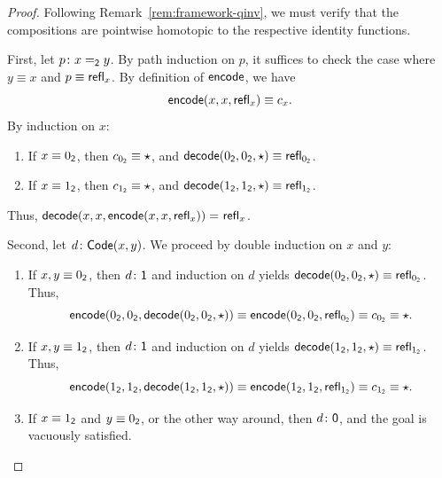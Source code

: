 \begin{proof}
    Following Remark~\ref{rem:framework-qinv}, we must verify that the compositions are pointwise homotopic to the respective identity functions.

    First, let $p\colon x\eq{\fun2}y$. By path induction on $p$, it suffices to check the case where $y\equiv x$ and $p\equiv\mathsf{refl}_x$. By definition of $\mathsf{encode}$, we have
    \[
        \mathsf{encode}(x,x,\mathsf{refl}_x) \equiv c_x.
    \]
    By induction on $x$:
    \begin{enumerate}[-]
        \item If $x\equiv0_{\mathsf{2}}$, then $c_{0_{\mathsf{2}}}\equiv\mathsf{\star}$, and $\mathsf{decode}(0_{\mathsf{2}},0_{\mathsf{2}},\mathsf{\star})\equiv\mathsf{refl}_{0_{\mathsf{2}}}$.
        
        \item If $x\equiv1_{\mathsf{2}}$, then $c_{1_{\mathsf{2}}}\equiv\mathsf{\star}$, and $\mathsf{decode}(1_{\mathsf{2}},1_{\mathsf{2}},\mathsf{\star})\equiv\mathsf{refl}_{1_{\mathsf{2}}}$.
    \end{enumerate}
    Thus, $\mathsf{decode}(x,x,\mathsf{encode}(x,x,\mathsf{refl}_x))\mathrel{=_{}}\mathsf{refl}_x$.

    Second, let $d\colon\fun{Code}(x,y)$. We proceed by double induction on $x$ and $y$:
    \begin{enumerate}[-]
        \item If $x,y\equiv0_{\mathsf{2}}$, then $d\colon\fun1$ and induction on $d$ yields $\mathsf{decode}(0_{\mathsf{2}},0_{\mathsf{2}},\mathsf{\star})\equiv\mathsf{refl}_{0_{\mathsf{2}}}$. Thus, 
        \[
            \mathsf{encode}(
                0_{\mathsf{2}},
                0_{\mathsf{2}},
                \mathsf{decode}(0_{\mathsf{2}},0_{\mathsf{2}},\mathsf{\star})
                )
            \equiv\mathsf{encode}(
                0_{\mathsf{2}},
                0_{\mathsf{2}},
                \mathsf{refl}_{0_{\mathsf{2}}}
                )
            \equiv c_{0_{\mathsf{2}}}
            \equiv\mathsf{\star}.
        \]

        \item If $x,y\equiv1_{\mathsf{2}}$, then $d\colon\fun1$ and induction on $d$ yields $\mathsf{decode}(1_{\mathsf{2}},1_{\mathsf{2}},\mathsf{\star})\equiv\mathsf{refl}_{1_{\mathsf{2}}}$. Thus,
        \[
            \mathsf{encode}(
                1_{\mathsf{2}},
                1_{\mathsf{2}},
                \mathsf{decode}(1_{\mathsf{2}},1_{\mathsf{2}},\mathsf{\star})
                )
            \equiv\mathsf{encode}(
                1_{\mathsf{2}},
                1_{\mathsf{2}},
                \mathsf{refl}_{1_{\mathsf{2}}}
                )
            \equiv c_{1_{\mathsf{2}}}\equiv\mathsf{\star}.
        \]
        
        \item If $x\equiv1_{\mathsf{2}}$ and $y\equiv0_{\mathsf{2}}$, or the other way around, then $d\colon\fun0$, and the goal is vacuously satisfied.
    \end{enumerate}
\end{proof}

